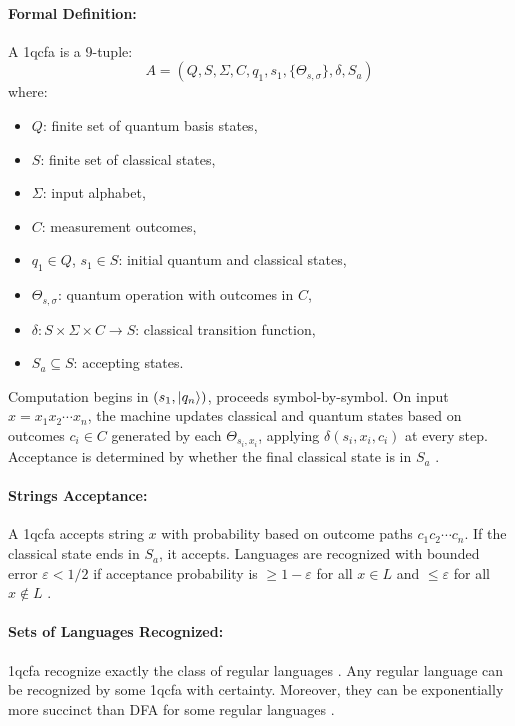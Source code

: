 \paragraph{Formal Definition:}  
A \gls{1qcfa} is a 9-tuple:
\[
A = (Q, S, \Sigma, C, q_1, s_1, \{\Theta_{s,\sigma}\}, \delta, S_a)
\]
where:
\begin{itemize}
    \item $Q$: finite set of quantum basis states,
    \item $S$: finite set of classical states,
    \item $\Sigma$: input alphabet,
    \item $C$: measurement outcomes,
    \item $q_1 \in Q$, $s_1 \in S$: initial quantum and classical states,
    \item $\Theta_{s,\sigma}$: quantum operation with outcomes in $C$,
    \item $\delta: S \times \Sigma \times C \to S$: classical transition function,
    \item $S_a \subseteq S$: accepting states.
\end{itemize}
Computation begins in $(s_1, \ket{q_n})$, proceeds symbol-by-symbol. On input $x = x_1x_2\cdots x_n$, the machine updates classical and quantum states based on outcomes $c_i \in C$ generated by each $\Theta_{s_i,x_i}$, applying $\delta(s_i,x_i,c_i)$ at every step. Acceptance is determined by whether the final classical state is in $S_a$ \cite{li2015hybrid}.

\paragraph{Strings Acceptance:}  
A \gls{1qcfa} accepts string $x$ with probability based on outcome paths $c_1c_2\cdots c_n$. If the classical state ends in $S_a$, it accepts. Languages are recognized with bounded error $\varepsilon < 1/2$ if acceptance probability is $\geq 1-\varepsilon$ for all $x \in L$ and $\leq \varepsilon$ for all $x \notin L$ \cite{li2015hybrid, zheng2012one}.

\paragraph{Sets of Languages Recognized:}  
\gls{1qcfa} recognize exactly the class of regular languages \cite{zheng2012one}. Any regular language can be recognized by some \gls{1qcfa} with certainty. Moreover, they can be exponentially more succinct than DFA for some regular languages \cite{xiao2021state}.

